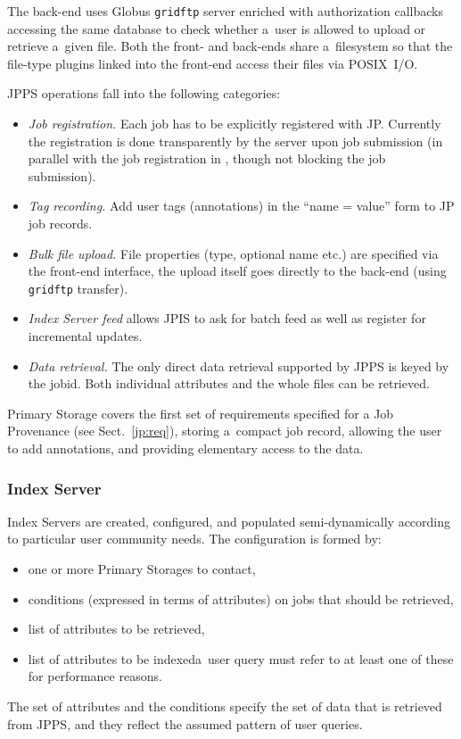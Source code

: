 The back-end uses Globus \texttt{gridftp} server enriched with authorization
callbacks accessing the same database to check whether a~user
is allowed to upload or retrieve a~given file.
Both the front- and back-ends share a~filesystem so that the file-type plugins
linked into the front-end access their files via POSIX~I/O.

JPPS operations fall into the following categories:
\begin{itemize}
\item\emph{Job registration.}
Each job has to be explicitly registered with JP.
Currently the registration is done transparently by the \LB server
upon job submission (in parallel with the job registration in \LB,
though not blocking the job submission).

\item\emph{Tag recording.}
Add user tags (annotations) in the ``name = value'' form to JP job records.

\item\emph{Bulk file upload.}
File properties (type, optional name etc.)
are specified via the front-end interface, the upload itself goes
directly to the back-end (using \texttt{gridftp} transfer).

\item\emph{Index Server feed} allows JPIS to ask for batch feed 
as well as register for incremental updates.

\item\emph{Data retrieval.}
The only direct data retrieval supported by JPPS is keyed by
the jobid. 
Both individual attributes and the whole files can be retrieved.
\end{itemize}

Primary Storage covers the first set of requirements specified
for a Job Provenance (see Sect.~\ref{jp:req}), \ie storing a~compact job
record, allowing the user to add annotations, and providing elementary
access to the data.

\subsubsection{Index Server}
Index Servers are created, configured, and populated  semi-dynamically
according to particular user community needs. 
The configuration is formed by:
\begin{itemize}
\item one or more Primary Storages to contact,
\item conditions (expressed in terms of \JP attributes) 
on jobs that should be retrieved,
\item list of attributes to be retrieved,
\item list of attributes to be indexed\Dash a~user query must refer
to at least one of these for performance reasons.
\end{itemize}
The set of attributes and the conditions specify the set of data that
is retrieved from JPPS, and they reflect the assumed pattern
of user queries.

